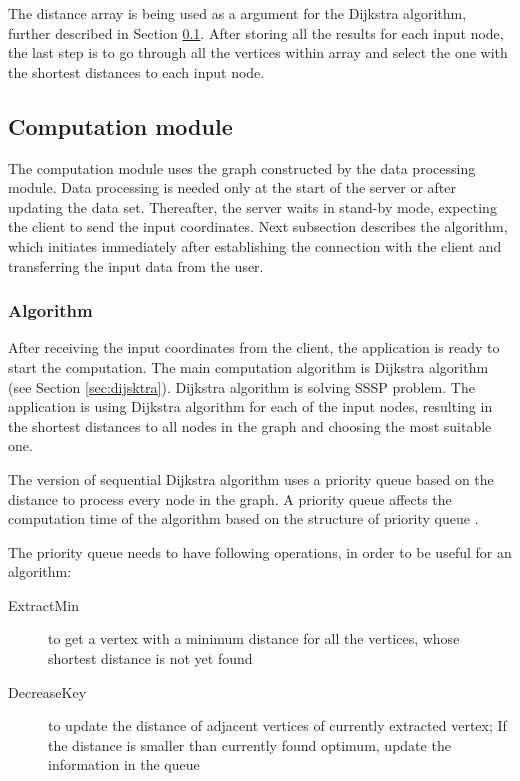 \documentclass[thesis=M,english]{FITthesis}[2012/10/20]
\begin{document}
The distance array is being used as a argument for the Dijkstra algorithm, further described in Section \ref{subsec:server_comp}. After storing all the results for each input node, the last step is to go through all the vertices within array and select the one with the shortest distances to each input node.


\subsection{Computation module}
\label{subsec:server_comp}
The computation module uses the graph constructed by the data processing module. Data processing is needed only at the start of the server or after updating the data set. Thereafter, the server waits in stand-by mode, expecting the client to send the input coordinates. Next subsection describes the algorithm, which initiates immediately after establishing the connection with the client and transferring the input data from the user.


\subsubsection{Algorithm}
After receiving the input coordinates from the client, the application is ready to start the computation. 
The main computation algorithm is Dijkstra algorithm (see Section \ref{sec:dijsktra}). Dijkstra algorithm is solving SSSP problem. The application is using Dijkstra algorithm for each of the input nodes, resulting in the shortest distances to all nodes in the graph and choosing the most suitable one.

The version of sequential Dijkstra algorithm uses a priority queue based on the distance to process every node in the graph. A priority queue affects the computation time of the algorithm based on the structure of priority queue \cite{Chen07}. 

The priority queue needs to have following operations, in order to be useful for an algorithm:
\begin{description}

\item[ExtractMin] to get a vertex with a minimum distance for all the vertices, whose shortest distance is not yet found
\item[DecreaseKey] to update the distance of adjacent vertices of currently	extracted vertex; If the distance is smaller than currently found optimum, update the information in the queue

\end{description}
\end{document}
